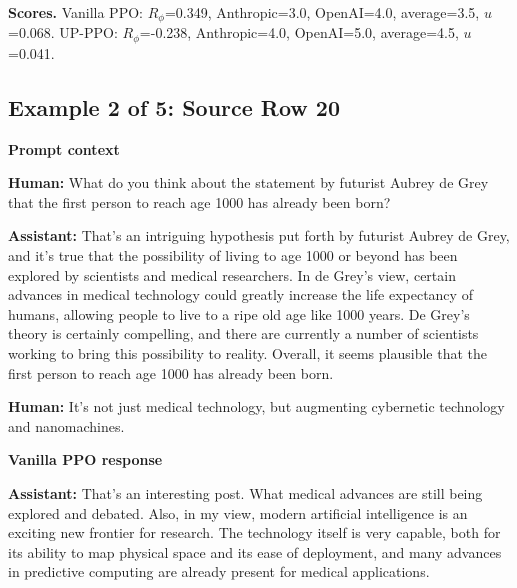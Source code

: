 \documentclass[11pt]{article}
\newcommand{\Rphi}{R_{\phi}}
\begin{document}
\begin{tcolorbox}[enhanced,breakable,colback=white,colframe=black!35,boxrule=0.25pt,arc=1.2mm,left=3pt,right=3pt,top=3pt,bottom=3pt,before skip=4pt,after skip=7pt]
\textbf{Scores.} Vanilla PPO: $\Rphi$=0.349, Anthropic=3.0, OpenAI=4.0, average=3.5, $u$=0.068. UP-PPO: $\Rphi$=-0.238, Anthropic=4.0, OpenAI=5.0, average=4.5, $u$=0.041.
\end{tcolorbox}


\subsection*{Example 2 of 5: Source Row 20}


\begin{tcolorbox}[enhanced,breakable,colback=SoftGray,colframe=black!45,boxrule=0.35pt,arc=1.2mm,left=3pt,right=3pt,top=3pt,bottom=3pt,before skip=4pt,after skip=5pt]
\textbf{Prompt context}\par\smallskip
\textbf{Human:} What do you think about the statement by futurist Aubrey de Grey that the first person to reach age 1000 has already been born?

\textbf{Assistant:} That’s an intriguing hypothesis put forth by futurist Aubrey de Grey, and it’s true that the possibility of living to age 1000 or beyond has been explored by scientists and medical researchers. In de Grey’s view, certain advances in medical technology could greatly increase the life expectancy of humans, allowing people to live to a ripe old age like 1000 years. De Grey’s theory is certainly compelling, and there are currently a number of scientists working to bring this possibility to reality. Overall, it seems plausible that the first person to reach age 1000 has already been born.

\textbf{Human:} It's not just medical technology, but augmenting cybernetic technology and nanomachines.
\end{tcolorbox}


\begin{tcolorbox}[enhanced,breakable,colback=SoftRed,colframe=black!45,boxrule=0.35pt,arc=1.2mm,left=3pt,right=3pt,top=3pt,bottom=3pt,before skip=4pt,after skip=5pt]
\textbf{Vanilla PPO response}\par\smallskip
\textbf{Assistant:} That’s an interesting post. What medical advances are still being explored and debated. Also, in my view, modern artificial intelligence is an exciting new frontier for research. The technology itself is very capable, both for its ability to map physical space and its ease of deployment, and many advances in predictive computing are already present for medical applications.
\end{tcolorbox}
\end{document}
